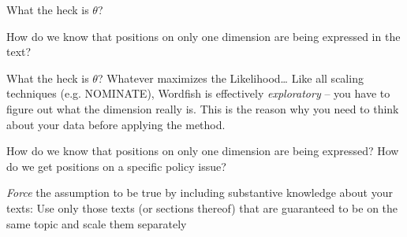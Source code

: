 \documentclass{mediumfoils}
\begin{document}
%
%




What the heck is $\theta$?

How do we know that positions on only one dimension are being expressed in the text?


What the heck is $\theta$?
\ita
\itm Whatever maximizes the Likelihood\ldots 
\itz
Like all scaling techniques (e.g. NOMINATE), Wordfish is effectively \textit{exploratory} -- you have to figure out what the dimension really is. This is the reason why you need to think about your data before applying the method.



How do we know that positions on only one dimension are being expressed? How do we get positions on a specific policy issue?

\textit {Force} the assumption to be true by including substantive knowledge about your texts:
\ita
\itm Use only those texts (or sections thereof)  that are guaranteed to be on the same topic and scale them separately 
\end{document}
